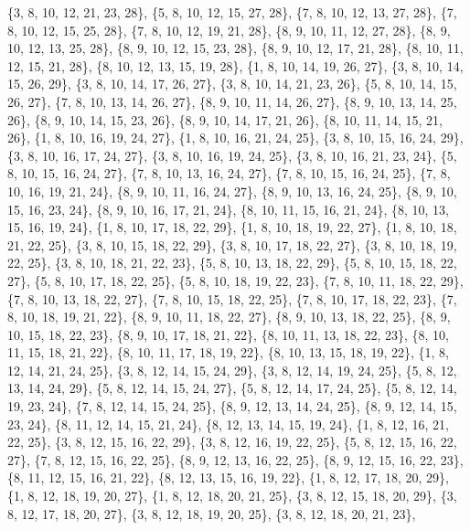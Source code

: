 \documentclass[11pt,a4paper]{article}
\begin{document}
{\{3, 8, 10, 12, 21, 23, 28\}, \{5, 8, 10, 12, 15, 27, 28\}, \{7, 8, 10, 12, 13, 27, 28\}, \{7, 8, 10, 12, 15, 25, 28\}, \{7, 8, 10, 12, 19, 21, 28\},
\{8, 9, 10, 11, 12, 27, 28\}, \{8, 9, 10, 12, 13, 25, 28\}, \{8, 9, 10, 12, 15, 23, 28\}, \{8, 9, 10, 12, 17, 21, 28\}, \{8, 10, 11, 12, 15, 21, 28\},
\{8, 10, 12, 13, 15, 19, 28\}, \{1, 8, 10, 14, 19, 26, 27\}, \{3, 8, 10, 14, 15, 26, 29\}, \{3, 8, 10, 14, 17, 26, 27\}, \{3, 8, 10, 14, 21, 23, 26\},
\{5, 8, 10, 14, 15, 26, 27\}, \{7, 8, 10, 13, 14, 26, 27\}, \{8, 9, 10, 11, 14, 26, 27\}, \{8, 9, 10, 13, 14, 25, 26\}, \{8, 9, 10, 14, 15, 23, 26\},
\{8, 9, 10, 14, 17, 21, 26\}, \{8, 10, 11, 14, 15, 21, 26\}, \{1, 8, 10, 16, 19, 24, 27\}, \{1, 8, 10, 16, 21, 24, 25\}, \{3, 8, 10, 15, 16, 24, 29\},
\{3, 8, 10, 16, 17, 24, 27\}, \{3, 8, 10, 16, 19, 24, 25\}, \{3, 8, 10, 16, 21, 23, 24\}, \{5, 8, 10, 15, 16, 24, 27\}, \{7, 8, 10, 13, 16, 24, 27\},
\{7, 8, 10, 15, 16, 24, 25\}, \{7, 8, 10, 16, 19, 21, 24\}, \{8, 9, 10, 11, 16, 24, 27\}, \{8, 9, 10, 13, 16, 24, 25\}, \{8, 9, 10, 15, 16, 23, 24\},
\{8, 9, 10, 16, 17, 21, 24\}, \{8, 10, 11, 15, 16, 21, 24\}, \{8, 10, 13, 15, 16, 19, 24\}, \{1, 8, 10, 17, 18, 22, 29\}, \{1, 8, 10, 18, 19, 22, 27\},
\{1, 8, 10, 18, 21, 22, 25\}, \{3, 8, 10, 15, 18, 22, 29\}, \{3, 8, 10, 17, 18, 22, 27\}, \{3, 8, 10, 18, 19, 22, 25\}, \{3, 8, 10, 18, 21, 22, 23\},
\{5, 8, 10, 13, 18, 22, 29\}, \{5, 8, 10, 15, 18, 22, 27\}, \{5, 8, 10, 17, 18, 22, 25\}, \{5, 8, 10, 18, 19, 22, 23\}, \{7, 8, 10, 11, 18, 22, 29\},
\{7, 8, 10, 13, 18, 22, 27\}, \{7, 8, 10, 15, 18, 22, 25\}, \{7, 8, 10, 17, 18, 22, 23\}, \{7, 8, 10, 18, 19, 21, 22\}, \{8, 9, 10, 11, 18, 22, 27\},
\{8, 9, 10, 13, 18, 22, 25\}, \{8, 9, 10, 15, 18, 22, 23\}, \{8, 9, 10, 17, 18, 21, 22\}, \{8, 10, 11, 13, 18, 22, 23\}, \{8, 10, 11, 15, 18, 21, 22\},
\{8, 10, 11, 17, 18, 19, 22\}, \{8, 10, 13, 15, 18, 19, 22\}, \{1, 8, 12, 14, 21, 24, 25\}, \{3, 8, 12, 14, 15, 24, 29\}, \{3, 8, 12, 14, 19, 24, 25\},
\{5, 8, 12, 13, 14, 24, 29\}, \{5, 8, 12, 14, 15, 24, 27\}, \{5, 8, 12, 14, 17, 24, 25\}, \{5, 8, 12, 14, 19, 23, 24\}, \{7, 8, 12, 14, 15, 24, 25\},
\{8, 9, 12, 13, 14, 24, 25\}, \{8, 9, 12, 14, 15, 23, 24\}, \{8, 11, 12, 14, 15, 21, 24\}, \{8, 12, 13, 14, 15, 19, 24\}, \{1, 8, 12, 16, 21, 22, 25\},
\{3, 8, 12, 15, 16, 22, 29\}, \{3, 8, 12, 16, 19, 22, 25\}, \{5, 8, 12, 15, 16, 22, 27\}, \{7, 8, 12, 15, 16, 22, 25\}, \{8, 9, 12, 13, 16, 22, 25\},
\{8, 9, 12, 15, 16, 22, 23\}, \{8, 11, 12, 15, 16, 21, 22\}, \{8, 12, 13, 15, 16, 19, 22\}, \{1, 8, 12, 17, 18, 20, 29\}, \{1, 8, 12, 18, 19, 20, 27\},
\{1, 8, 12, 18, 20, 21, 25\}, \{3, 8, 12, 15, 18, 20, 29\}, \{3, 8, 12, 17, 18, 20, 27\}, \{3, 8, 12, 18, 19, 20, 25\}, \{3, 8, 12, 18, 20, 21, 23\},
}
\end{document}
